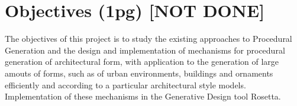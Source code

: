 
% 
% 

\section{Objectives (1pg) [NOT DONE]}
\label{sec:objectives}%


The objectives of this project is to study the existing approaches to Procedural Generation and the design and implementation of mechanisms for procedural generation of architectural form, with application to the generation of large amouts of forms, such as of urban environments, buildings and ornaments efficiently and according to a particular architectural style models. Implementation of these mechanisms in the Generative Design tool Rosetta.




